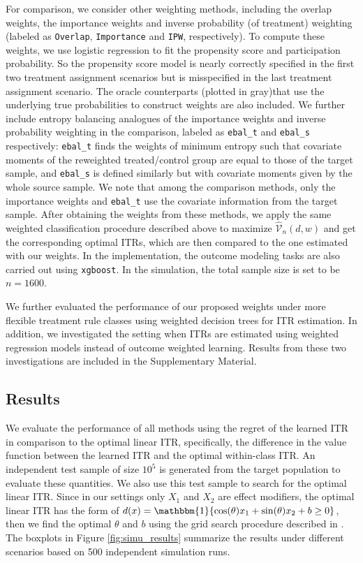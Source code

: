 \documentclass[12pt]{article}
\newcommand{\ind}{\mathbbm{1}}
\begin{document}
For comparison, we consider other weighting methods, including the overlap weights, the importance weights and inverse probability (of treatment) weighting (labeled as \texttt{Overlap}, \texttt{Importance} and \texttt{IPW}, respectively). To compute these weights, we use logistic regression to fit the propensity score and participation probability. So the propensity score model is nearly correctly specified in the first two treatment assignment scenarios but is misspecified in the last treatment assignment scenario. The oracle counterparts (plotted in gray)that use the underlying true probabilities to construct weights are also included. We further include entropy balancing \citep{hainmueller2012entropy} analogues of the importance weights and inverse probability weighting in the comparison, labeled as \texttt{ebal\_t} and \texttt{ebal\_s} respectively: \texttt{ebal\_t} finds the weights of minimum entropy such that covariate moments of the reweighted treated/control group are equal to those of the target sample, and \texttt{ebal\_s} is defined similarly but with covariate moments given by the whole source sample. 
We note that among the comparison methods, only the importance weights and \texttt{ebal\_t} use the covariate information from the target sample. After obtaining the weights from these methods, we apply the same weighted classification procedure described above to maximize $\widehat{\mathcal{V}}_n(d, w)$ and get the corresponding optimal ITRs, which are then compared to the one estimated with our weights. In the implementation, the outcome modeling tasks are also carried out using \texttt{xgboost}. In the simulation, the total sample size is set to be $n = 1600$. 

{We further evaluated the performance of our proposed weights under more flexible treatment rule classes using weighted decision trees for ITR estimation. In addition, we investigated the setting when ITRs are estimated using weighted regression models instead of outcome weighted learning. Results from these two investigations are included in the Supplementary Material.}

\subsection{Results}
We evaluate the performance of all methods using the regret of the learned ITR in comparison to the optimal linear ITR, specifically, the difference in the value function between the learned ITR and the optimal within-class ITR. An independent test sample of size $10^5$ is generated from the target population to evaluate these quantities. We also use this test sample to search for the optimal linear ITR. Since in our settings only $X_1$ and $X_2$ are effect modifiers, the optimal linear ITR has the form of $d(x) = \ind \{\cos(\theta) x_1 + \sin(\theta) x_2 + b \ge 0 \}$, then we find the optimal $\theta$ and $b$ using the grid search procedure described in \citet{kallus2020more}. The boxplots in Figure \ref{fig:simu_results} summarize the results under different scenarios based on 500 independent simulation runs.
\end{document}
